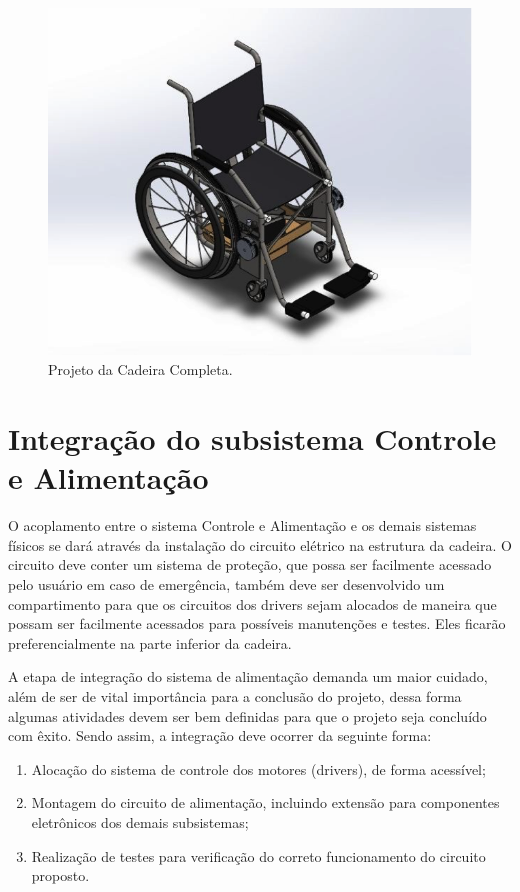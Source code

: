 \begin{figure}[!htb]
    \begin{center}
        \includegraphics{figuras/complete_chair.png}
    \end{center}
    \caption{Projeto da Cadeira Completa.}
    \label{fig:complete_chair}
\end{figure}

\section{Integração do subsistema Controle e Alimentação}

O acoplamento entre o sistema Controle e Alimentação e os demais sistemas físicos se
dará através da instalação do circuito elétrico na estrutura da cadeira. O circuito deve conter
um sistema de proteção, que possa ser facilmente acessado pelo usuário em caso de
emergência, também deve ser desenvolvido um compartimento para que os circuitos dos
drivers sejam alocados de maneira que possam ser facilmente acessados para possíveis
manutenções e testes. Eles ficarão preferencialmente na parte inferior da cadeira.

A etapa de integração do sistema de alimentação demanda um maior cuidado, além de
ser de vital importância para a conclusão do projeto, dessa forma algumas atividades devem
ser bem definidas para que o projeto seja concluído com êxito. Sendo assim, a integração deve
ocorrer da seguinte forma:

\begin{enumerate}
  \item Alocação do sistema de controle dos motores (drivers), de forma acessível;
  \item Montagem do circuito de alimentação, incluindo extensão para componentes
  eletrônicos dos demais subsistemas;
  \item Realização de testes para verificação do correto funcionamento do circuito proposto.
\end{enumerate}


